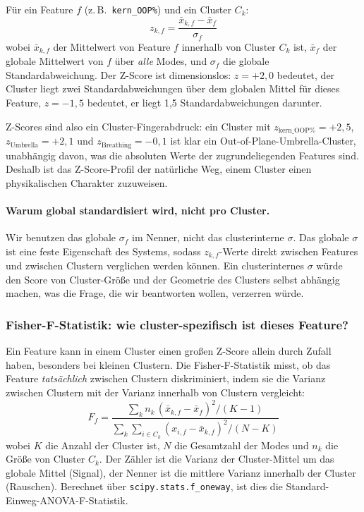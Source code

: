 \documentclass[11pt,a4paper,twoside]{article}
\theoremstyle{remark}
\begin{document}
F\"ur ein Feature $f$ (z.\,B.\ \texttt{kern\_OOP\%}) und ein Cluster
$C_k$:
\begin{equation}
  z_{k,f} = \frac{\bar{x}_{k,f} - \bar{x}_f}{\sigma_f}
\end{equation}
wobei $\bar{x}_{k,f}$ der Mittelwert von Feature $f$ innerhalb von
Cluster $C_k$ ist, $\bar{x}_f$ der globale Mittelwert von $f$
\"uber \emph{alle} Modes, und $\sigma_f$ die globale
Standardabweichung. Der Z-Score ist dimensionslos: $z = +2{,}0$
bedeutet, der Cluster liegt zwei Standardabweichungen \"uber dem
globalen Mittel f\"ur dieses Feature, $z = -1{,}5$ bedeutet, er
liegt 1,5 Standardabweichungen darunter.

Z-Scores sind also ein Cluster-Fingerabdruck: ein Cluster mit
$z_{\text{kern\_OOP}\%} = +2{,}5$,
$z_{\text{Umbrella}} = +2{,}1$ und
$z_{\text{Breathing}} = -0{,}1$ ist klar ein Out-of-Plane-Umbrella-Cluster,
unabh\"angig davon, was die absoluten Werte der zugrundeliegenden
Features sind. Deshalb ist das Z-Score-Profil der nat\"urliche Weg,
einem Cluster einen physikalischen Charakter zuzuweisen.

\paragraph{Warum global standardisiert wird, nicht pro Cluster.}
Wir benutzen das globale $\sigma_f$ im Nenner, nicht das
clusterinterne $\sigma$. Das globale $\sigma$ ist eine feste
Eigenschaft des Systems, sodass $z_{k,f}$-Werte direkt zwischen
Features und zwischen Clustern verglichen werden k\"onnen. Ein
clusterinternes $\sigma$ w\"urde den Score von Cluster-Gr\"o\ss e
und der Geometrie des Clusters selbst abh\"angig machen, was die
Frage, die wir beantworten wollen, verzerren w\"urde.

\subsubsection*{Fisher-F-Statistik: wie cluster-spezifisch ist dieses Feature?}

Ein Feature kann in einem Cluster einen gro\ss en Z-Score allein
durch Zufall haben, besonders bei kleinen Clustern. Die
Fisher-F-Statistik misst, ob das Feature \emph{tats\"achlich}
zwischen Clustern diskriminiert, indem sie die Varianz zwischen
Clustern mit der Varianz innerhalb von Clustern vergleicht:
\begin{equation}
  F_f = \frac{
    \sum_k n_k\,(\bar{x}_{k,f} - \bar{x}_f)^2 / (K - 1)
  }{
    \sum_k \sum_{i \in C_k} (x_{i,f} - \bar{x}_{k,f})^2 / (N - K)
  }
\end{equation}
wobei $K$ die Anzahl der Cluster ist, $N$ die Gesamtzahl der Modes
und $n_k$ die Gr\"o\ss e von Cluster $C_k$. Der Z\"ahler ist die
Varianz der Cluster-Mittel um das globale Mittel (Signal), der
Nenner ist die mittlere Varianz innerhalb der Cluster (Rauschen).
Berechnet \"uber \texttt{scipy.stats.f\_oneway}, ist dies die
Standard-Einweg-ANOVA-F-Statistik.
\end{document}
